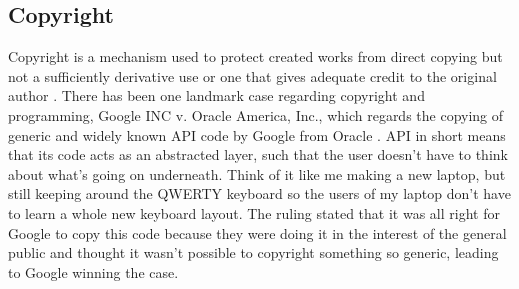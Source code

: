 \documentclass[journal]{IEEEtran}
\begin{document}
\subsection{Copyright}



Copyright is a mechanism used to protect created works from direct copying
but not a sufficiently derivative use or one that gives adequate credit to
the original author \cite[p.~55]{stokes2021}. There has been one landmark
case regarding copyright and programming, Google INC v. Oracle America, Inc.,
which regards the copying of generic and widely known API code by Google
from Oracle \cite{harvard}. API in short means that its code acts as an
abstracted layer, such that the user doesn't have to think about what's going
on underneath. Think of it like me making a new laptop, but still keeping
around the QWERTY keyboard so the users of my laptop don't have to learn a
whole new keyboard layout. The ruling stated that it was all right for Google to
copy this code because they were doing it in the interest of the general
public and thought it wasn't possible to copyright something so generic,
leading to Google winning the case.



\end{document}

